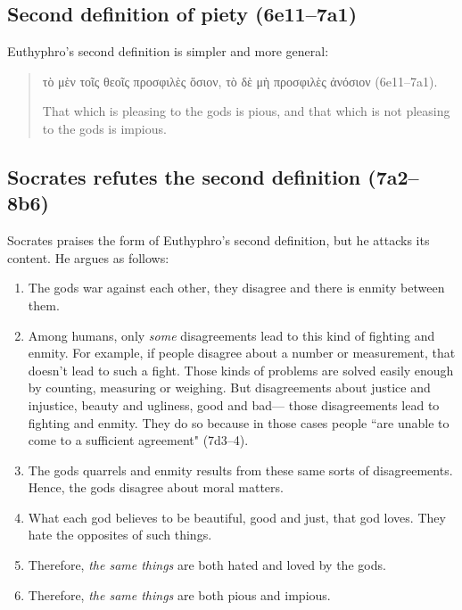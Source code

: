 \documentclass[11pt]{article}
\begin{document}

\subsection{Second definition of piety (6e11--7a1)}

Euthyphro's second definition is simpler and more general:

\begin{quote}

    {\g
    τὸ μὲν τοῖς θεοῖς προσφιλὲς ὅσιον, τὸ δὲ μὴ προσφιλὲς ἀνόσιον
    } (6e11--7a1).

    That which is pleasing to the gods is pious, and that which is not
    pleasing to the gods is impious.

\end{quote}

\subsection{Socrates refutes the second definition (7a2--8b6)}

Socrates praises the form of Euthyphro's second definition, but he attacks
its content.  He argues as follows:

\begin{enumerate}

    \item The gods war against each other, they disagree and there is
        enmity between them.

    \item Among humans, only \emph{some} disagreements lead to this kind of
        fighting and enmity.  For example, if people disagree about
        a number or measurement, that doesn't lead to such a fight.  Those
        kinds of problems are solved easily enough by counting, measuring
        or weighing.  But disagreements about justice and injustice, beauty
        and ugliness, good and bad--- those disagreements lead to fighting
        and enmity.  They do so because in those cases people ``are unable
        to come to a sufficient agreement" (7d3--4).

    \item The gods quarrels and enmity results from these same sorts of
        disagreements.  Hence, the gods disagree about moral matters.

    \item What each god believes to be beautiful, good and just, that god
        loves.  They hate the opposites of such things.

    \item Therefore, \emph{the same things} are both hated and loved by the
        gods.

    \item Therefore, \emph{the same things} are both pious and impious.

\end{enumerate}
\end{document}
